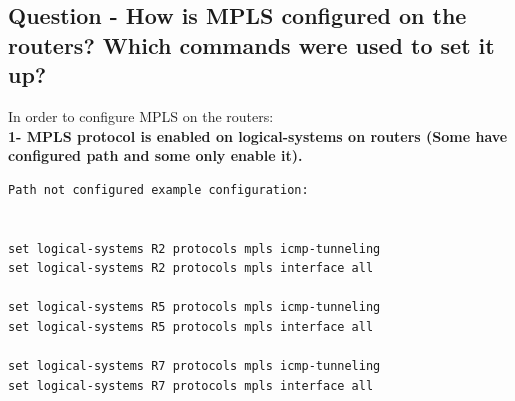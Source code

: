 \documentclass[a4paper]{article}
\begin{document}
\subsection{Question - How is MPLS configured on the routers? Which commands were used to set it up?}

In order to configure MPLS on the routers: \\

\textbf{1- MPLS protocol is enabled on logical-systems on routers (Some have configured path and some only enable it). }

\begin{verbatim}
Path not configured example configuration:


set logical-systems R2 protocols mpls icmp-tunneling
set logical-systems R2 protocols mpls interface all

set logical-systems R5 protocols mpls icmp-tunneling
set logical-systems R5 protocols mpls interface all

set logical-systems R7 protocols mpls icmp-tunneling
set logical-systems R7 protocols mpls interface all  
    
\end{verbatim}
\end{document}
